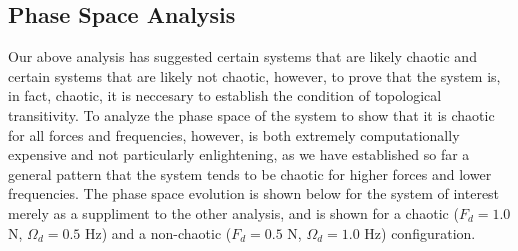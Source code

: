 \documentclass[11pt]{article} %
\begin{document}
    \subsection{Phase Space Analysis}
    Our above analysis has suggested certain systems that are likely chaotic and certain systems that are likely not chaotic, however, to prove that
    the system is, in fact, chaotic, it is neccesary to establish the condition of topological transitivity. To analyze the phase space of the system 
    to show that it is chaotic for all forces and frequencies, however, is both extremely computationally expensive and not particularly enlightening, 
    as we have established so far a general pattern that the system tends to be chaotic for higher forces and lower frequencies. The phase space evolution 
    is shown below for the system of interest merely as a suppliment to the other analysis, and is shown for a chaotic ($F_d=1.0$ N, $\Omega_d=0.5$ Hz) and
    a non-chaotic ($F_d=0.5$ N, $\Omega_d=1.0$ Hz) configuration.
\end{document}
